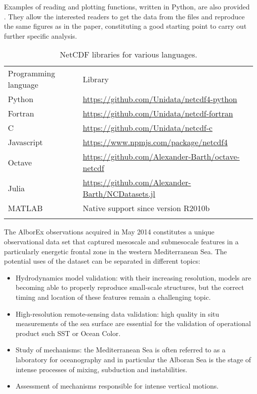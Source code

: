 \documentclass[essd,manuscript]{copernicus}
\begin{document}
Examples of reading and plotting functions, written in Python, are also provided \citep{??????}. They allow the interested readers to get the data from the files and reproduce the same figures as in the paper, constituting a good starting point to carry out further specific analysis. 

\begin{table*}[h]
\caption{NetCDF libraries for various languages.\label{tab:netcdflib}}
\begin{tabular}{ll}
\tophline
Programming language		& Library 		\\
\middlehline				 
Python						& \url{https://github.com/Unidata/netcdf4-python}\\
Fortran						& \url{https://github.com/Unidata/netcdf-fortran}\\
C							& \url{https://github.com/Unidata/netcdf-c}\\
Javascript					& \url{https://www.npmjs.com/package/netcdf4}\\
Octave 						& \url{https://github.com/Alexander-Barth/octave-netcdf}\\
Julia						& \url{https://github.com/Alexander-Barth/NCDatasets.jl}\\
MATLAB						& Native support since version R2010b\\
\bottomhline
\end{tabular}
\end{table*}




The AlborEx observations acquired in May 2014 constitutes a unique observational data set that captured mesoscale and submesocale features in a particularly energetic frontal zone in the western Mediterranean Sea. The potential uses of the dataset can be separated in different topics:
\begin{itemize}
\item Hydrodynamics model validation: with their increasing resolution, models are becoming able to properly reproduce small-scale structures, but the correct timing and location of these features remain a challenging topic.
\item High-resolution remote-sensing data validation: high quality in situ measurements of the sea surface are essential for the validation of operational product such SST or Ocean Color. 
\item Study of mechanisms: the Mediterranean Sea is often referred to as a laboratory for oceanography and in particular the Alboran Sea is the stage of intense processes of mixing, subduction and instabilities.
\item Assessment of mechanisms responsible for intense vertical motions.
\end{itemize} 
\end{document}
